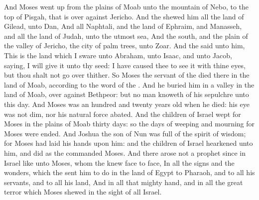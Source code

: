 \begin{biblechapter} %
 And Moses went up from the plains of Moab unto the mountain of Nebo, to the top of Pisgah, that is over against Jericho. And the \LORD shewed him all the land of Gilead, unto Dan,
\verse And all Naphtali, and the land of Ephraim, and Manasseh, and all the land of Judah, unto the utmost sea,
\verse And the south, and the plain of the valley of Jericho, the city of palm trees, unto Zoar.
\verse And the \LORD said unto him, This is the land which I sware unto Abraham, unto Isaac, and unto Jacob, saying, I will give it unto thy seed: I have caused thee to see it with thine eyes, but thou shalt not go over thither.
\verse So Moses the servant of the \LORD died there in the land of Moab, according to the word of the \LORD.
\verse And he buried him in a valley in the land of Moab, over against Bethpeor: but no man knoweth of his sepulchre unto this day.
\verse And Moses was an hundred and twenty years old when he died: his eye was not dim, nor his natural force abated.
\verse And the children of Israel wept for Moses in the plains of Moab thirty days: so the days of weeping and mourning for Moses were ended.
\verse And Joshua the son of Nun was full of the spirit of wisdom; for Moses had laid his hands upon him: and the children of Israel hearkened unto him, and did as the \LORD commanded Moses.
\verse And there arose not a prophet since in Israel like unto Moses, whom the \LORD knew face to face,
\verse In all the signs and the wonders, which the \LORD sent him to do in the land of Egypt to Pharaoh, and to all his servants, and to all his land,
\verse And in all that mighty hand, and in all the great terror which Moses shewed in the sight of all Israel.
\end{biblechapter}
